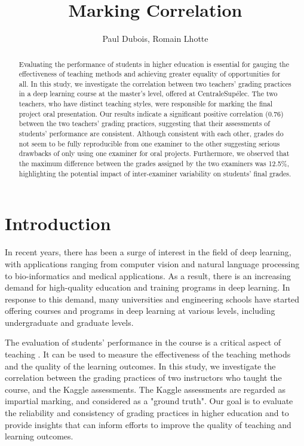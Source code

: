 \documentclass[a4paper]{article}
\title{Marking Correlation}
\author{Paul Dubois, Romain Lhotte}
\begin{document}
	\maketitle
	\begin{abstract}
		Evaluating the performance of students in higher education is essential for gauging the effectiveness of teaching methods and achieving greater equality of opportunities for all.
		In this study, we investigate the correlation between two teachers' grading practices in a deep learning course at the master's level, offered at CentraleSupélec.
		The two teachers, who have distinct teaching styles, were responsible for marking the final project oral presentation.
		Our results indicate a significant positive correlation (0.76) between the two teachers' grading practices, suggesting that their assessments of students' performance are consistent.
		Although consistent with each other, grades do not seem to be fully reproducible from one examiner to the other suggesting serious drawbacks of only using one examiner for oral projects.
		Furthermore, we observed that the maximum difference between the grades assigned by the two examiners was 12.5\%, highlighting the potential impact of inter-examiner variability on students' final grades.
	\end{abstract}
	
	\section{Introduction}
	In recent years, there has been a surge of interest in the field of deep learning, with applications ranging from computer vision\cite{Voulodimos2018}\cite{CHAI2021} and natural language processing\cite{sun2021} to bio-informatics\cite{MIN2016}\cite{Zhang2020} and medical applications\cite{JAMIA2019}.
	As a result, there is an increasing demand for high-quality education and training programs in deep learning\cite{ResearchAndMarkets2023}.
	In response to this demand, many universities and engineering schools have started offering courses and programs in deep learning at various levels, including undergraduate and graduate levels.
	
	The evaluation of students' performance in the course is a critical aspect of teaching \cite{Karaman2011}\cite{Efu2019}.
	It can be used to measure the effectiveness of the teaching methods and the quality of the learning outcomes.
	In this study, we investigate the correlation between the grading practices of two instructors who taught the course, and the Kaggle assessments.
	The Kaggle assessments are regarded as impartial marking, and considered as a "ground truth".
	Our goal is to evaluate the reliability and consistency of grading practices in higher education and to provide insights that can inform efforts to improve the quality of teaching and learning outcomes.
	
\end{document}
